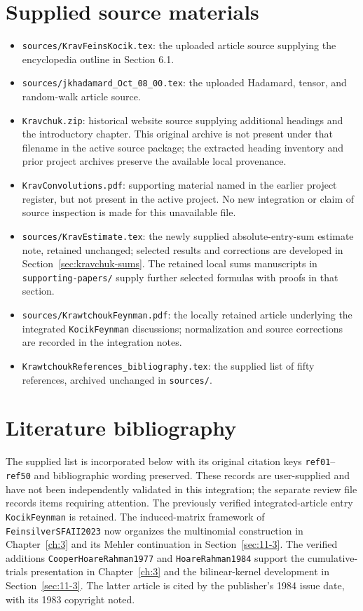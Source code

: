 \documentclass[11pt,oneside]{amsbook}
\theoremstyle{definition}
\theoremstyle{remark}
\begin{document}
\section*{Supplied source materials}
\begin{itemize}
\item \texttt{sources/KravFeinsKocik.tex}: the uploaded article source supplying the encyclopedia outline in Section 6.1.
\item \texttt{sources/jkhadamard\_Oct\_08\_00.tex}: the uploaded Hadamard, tensor, and random-walk article source.
\item \texttt{Kravchuk.zip}: historical website source supplying additional headings and the introductory chapter. This original archive is not present under that filename in the active source package; the extracted heading inventory and prior project archives preserve the available local provenance.
\item \texttt{KravConvolutions.pdf}: supporting material named in the earlier project register, but not present in the active project. No new integration or claim of source inspection is made for this unavailable file.
\item \texttt{sources/KravEstimate.tex}: the newly supplied absolute-entry-sum estimate note, retained unchanged; selected results and corrections are developed in Section~\ref{sec:kravchuk-sums}. The retained local sums manuscripts in \texttt{supporting-papers/} supply further selected formulas with proofs in that section.
\item \texttt{sources/KrawtchoukFeynman.pdf}: the locally retained article underlying the integrated \texttt{KocikFeynman} discussions; normalization and source corrections are recorded in the integration notes.
\item \texttt{KrawtchoukReferences\_bibliography.tex}: the supplied list of fifty references, archived unchanged in \texttt{sources/}.
\end{itemize}


\section*{Literature bibliography}
The supplied list is incorporated below with its original citation keys
\texttt{ref01}--\texttt{ref50} and bibliographic wording preserved.
These records are user-supplied and have not been independently
validated in this integration; the separate review file records items
requiring attention. The previously verified integrated-article entry
\texttt{KocikFeynman} is retained.
The induced-matrix framework of \texttt{FeinsilverSFAII2023} now
organizes the multinomial construction in Chapter~\ref{ch:3} and its
Mehler continuation in Section~\ref{sec:11-3}.
The verified additions \texttt{CooperHoareRahman1977} and
\texttt{HoareRahman1984} support the cumulative-trials presentation in
Chapter~\ref{ch:3} and the bilinear-kernel development in
Section~\ref{sec:11-3}. The latter article is cited by the publisher's
1984 issue date, with its 1983 copyright noted.

\end{document}
